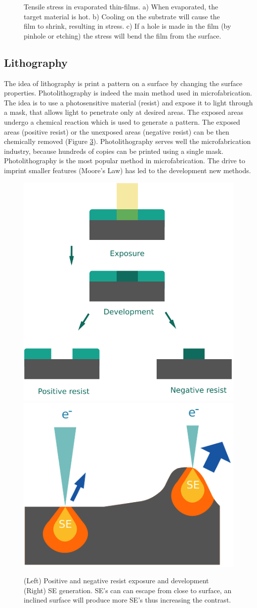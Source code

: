 \documentclass[final]{jyflluk}
\begin{document}
\begin{figure}[h]
\begin{subfigure}[ht]{0.3\textwidth}
        \caption{} \label{fig:desisdfsdfgn1}
    \end{subfigure}
    \hfill
    \caption{Tensile stress in evaporated thin-films. a) When evaporated, the target material is hot. b) Cooling on the substrate will cause the film to shrink, resulting in stress. c) If a hole is made in the film (by pinhole or etching) the stress will bend the film from the surface.} \label{fig:stresa}
\end{figure}  

\subsection{Lithography}
\label{sec:xx3}

The idea of lithography is print a pattern on a surface by changing the surface properties.  Photolithography is indeed the main method used in microfabrication. The idea is to use a photosensitive material (resist) and expose it to light through a mask, that allows light to penetrate only at desired areas. The exposed areas undergo a chemical reaction which is used to generate a pattern. The exposed areas (positive resist) or the unexposed areas (negative resist) can be then chemically removed (Figure \ref{fig:SEM}).  Photolithography serves well the microfabrication industry, because hundreds of copies can be printed using a single mask. Photolithography is the most popular method in microfabrication. The drive to imprint smaller features (Moore’s Law) has led to the development new methods.
\cite{franssila2010introduction, lee2010microfabrication}


\begin{figure}[hb]%
    \centering
    \includegraphics[width=.42\linewidth]{images/pos_neg_resist.pdf}
    \hfill
    \includegraphics[width=.43\linewidth]{images/SE.pdf}
    \caption{(Left) Positive and negative resist exposure and development (Right) SE generation. SE's can can escape from close to surface, an inclined surface will produce more SE's thus increasing the contrast.}
    \label{fig:SEM}%
\end{figure}
\end{document}
